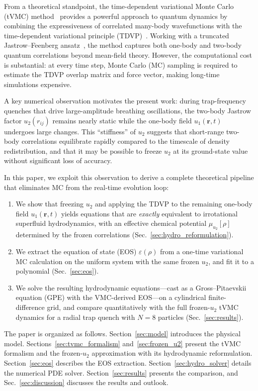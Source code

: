 \documentclass[twocolumn,superscriptaddress,aps,pra,longbibliography]{revtex4-2}
\newcommand{\br}{\mathbf{r}}
\begin{document}
From a theoretical standpoint, the time-dependent variational Monte Carlo
(tVMC)
method~\cite{Carleo2012,Carleo2014} provides a powerful approach
to quantum dynamics by combining the expressiveness of correlated
many-body wavefunctions with the time-dependent variational principle
(TDVP)~\cite{Dirac1930,Frenkel1934,McLachlan1964}.
Working with a truncated Jastrow--Feenberg
ansatz~\cite{Jastrow1955,Feenberg1969}, the method captures
both one-body and two-body quantum correlations beyond mean-field theory.
However, the computational cost is substantial: at every time step,
Monte Carlo (MC) sampling is required to estimate the TDVP overlap matrix
and force vector, making long-time simulations expensive.

A key numerical observation motivates the present work: during
trap-frequency quenches that drive large-amplitude breathing oscillations,
the two-body Jastrow factor $u_2(r_{ij})$ remains nearly static while the
one-body field $u_1(\br,t)$ undergoes large changes.
This ``stiffness'' of $u_2$ suggests that short-range two-body correlations
equilibrate rapidly compared to the timescale of density redistribution,
and that it may be possible to freeze $u_2$ at its ground-state value
without significant loss of accuracy.

In this paper, we exploit this observation to derive a complete theoretical
pipeline that eliminates MC from the real-time evolution loop:
\begin{enumerate}
\item We show that freezing $u_2$ and applying the TDVP to the remaining
one-body field $u_1(\br,t)$ yields equations that are \emph{exactly}
equivalent to irrotational superfluid hydrodynamics, with an effective
chemical potential $\mu_{u_2}[\rho]$ determined by the frozen correlations
(Sec.~\ref{sec:hydro_reformulation}).
\item We extract the equation of state (EOS)
$\varepsilon(\rho)$ from a one-time variational MC calculation on the
uniform system with the same frozen $u_2$, and fit it to a polynomial
(Sec.~\ref{sec:eos}).
\item We solve the resulting hydrodynamic equations---cast as a
Gross--Pitaevskii equation (GPE) with the VMC-derived EOS---on a
cylindrical finite-difference grid, and compare quantitatively with
the full frozen-$u_2$ tVMC dynamics for a radial trap quench with $N=8$
particles (Sec.~\ref{sec:results}).
\end{enumerate}
The paper is organized as follows. Section~\ref{sec:model} introduces
the physical model. Sections~\ref{sec:tvmc_formalism}
and~\ref{sec:frozen_u2} present the tVMC formalism and the frozen-$u_2$
approximation with its hydrodynamic reformulation.
Section~\ref{sec:eos} describes the EOS extraction.
Section~\ref{sec:hydro_solver} details the numerical PDE solver.
Section~\ref{sec:results} presents the comparison, and
Sec.~\ref{sec:discussion} discusses the results and outlook.
\end{document}
